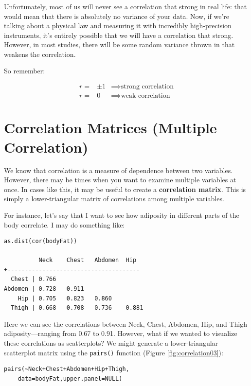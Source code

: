 Unfortunately, most of us will never see a correlation that strong in real life: that would mean that there is absolutely no variance of your data. Now, if we're talking about a physical law and measuring it with incredibly high-precision instruments, it's entirely possible that we will have a correlation that strong. However, in most studies, there will be some random variance thrown in that weakens the correlation.

So remember:

\begin{eqnarray*}
r=& \pm1 &\implies \text{strong correlation} \\
r=& 0 &\implies \text{weak correlation}
\end{eqnarray*}

\section{Correlation Matrices (Multiple Correlation)}
We know that correlation is a measure of dependence between two variables. However, there may be times when you want to examine multiple variables at once. In cases like this, it may be useful to create a \textbf{correlation matrix}. This is simply a lower-triangular matrix of correlations among multiple variables.

For instance, let's say that I want to see how adiposity in different parts of the body correlate. I may do something like:

\begin{framed}
\begin{Verbatim}[samepage=TRUE]
as.dist(cor(bodyFat))

          Neck    Chest   Abdomen  Hip
+--------------------------------------
  Chest | 0.766 
Abdomen | 0.728   0.911
    Hip | 0.705   0.823   0.860  
  Thigh | 0.668   0.708   0.736    0.881
\end{Verbatim}
\end{framed}

Here we can see the correlations between Neck, Chest, Abdomen, Hip, and Thigh adiposity---ranging from 0.67 to 0.91. However, what if we wanted to visualize these correlations as scatterplots? We might generate a lower-triangular scatterplot matrix using the \verb|pairs()| function (Figure \ref{fig:correlation03}):

\begin{framed}
\begin{Verbatim}[samepage=TRUE]
pairs(~Neck+Chest+Abdomen+Hip+Thigh,
    data=bodyFat,upper.panel=NULL)
\end{Verbatim}
\end{framed}

